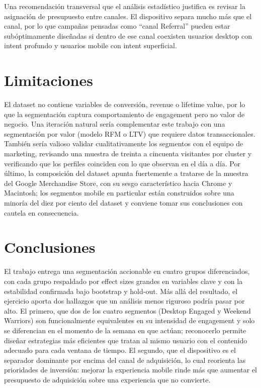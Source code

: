 \documentclass[11pt,a4paper]{article}
\begin{document}
Una recomendación transversal que el análisis estadístico justifica es revisar
la asignación de presupuesto entre canales. El dispositivo separa mucho más que
el canal, por lo que campañas pensadas como ``canal Referral'' pueden estar
subóptimamente diseñadas si dentro de ese canal coexisten usuarios desktop con
intent profundo y usuarios mobile con intent superficial.

\section{Limitaciones}

El dataset no contiene variables de conversión, revenue o lifetime value, por lo
que la segmentación captura comportamiento de engagement pero no valor de
negocio. Una iteración natural sería complementar este trabajo con una
segmentación por valor (modelo RFM o LTV) que requiere datos transaccionales.
También sería valioso validar cualitativamente los segmentos con el equipo de
marketing, revisando una muestra de treinta a cincuenta visitantes por cluster
y verificando que los perfiles coinciden con lo que observan en el día a día.
Por último, la composición del dataset apunta fuertemente a tratarse de la
muestra del Google Merchandise Store, con su sesgo característico hacia
Chrome y Macintosh; los segmentos mobile en particular están construidos sobre
una minoría del diez por ciento del dataset y conviene tomar sus conclusiones
con cautela en consecuencia.

\section{Conclusiones}

El trabajo entrega una segmentación accionable en cuatro grupos diferenciados,
con cada grupo respaldado por effect sizes grandes en variables clave y con la
estabilidad confirmada bajo bootstrap y hold-out. Más allá del resultado, el
ejercicio aporta dos hallazgos que un análisis menos riguroso podría pasar por
alto. El primero, que dos de los cuatro segmentos (Desktop Engaged y Weekend
Warriors) son funcionalmente equivalentes en su intensidad de engagement y solo
se diferencian en el momento de la semana en que actúan; reconocerlo permite
diseñar estrategias más eficientes que tratan al mismo usuario con el contenido
adecuado para cada ventana de tiempo. El segundo, que el dispositivo es el
separador dominante por encima del canal de adquisición, lo cual reorienta las
prioridades de inversión: mejorar la experiencia mobile rinde más que aumentar
el presupuesto de adquisición sobre una experiencia que no convierte.
\end{document}
